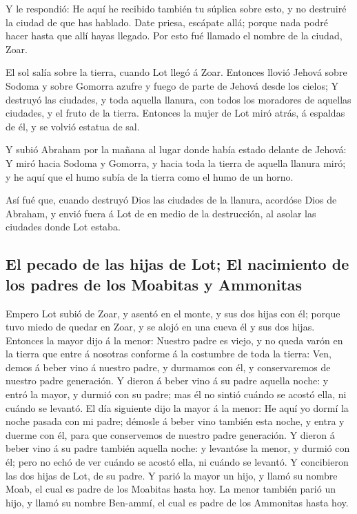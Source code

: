  Y le respondió: He aquí he recibido también tu súplica
sobre esto, y no destruiré la ciudad de que has hablado. 
Date priesa, escápate allá; porque nada podré hacer hasta que allí hayas
llegado. Por esto fué llamado el nombre de la ciudad, Zoar.

 El sol salía sobre la tierra, cuando Lot llegó á Zoar.
 Entonces llovió Jehová sobre Sodoma y sobre Gomorra azufre
y fuego de parte de Jehová desde los cielos;  Y destruyó
las ciudades, y toda aquella llanura, con todos los moradores de
aquellas ciudades, y el fruto de la tierra.  Entonces la
mujer de Lot miró atrás, á espaldas de él, y se volvió estatua de sal.

 Y subió Abraham por la mañana al lugar donde había estado
delante de Jehová:  Y miró hacia Sodoma y Gomorra, y hacia
toda la tierra de aquella llanura miró; y he aquí que el humo subía de
la tierra como el humo de un horno.

 Así fué que, cuando destruyó Dios las ciudades de la
llanura, acordóse Dios de Abraham, y envió fuera á Lot de en medio de la
destrucción, al asolar las ciudades donde Lot estaba.

\hypertarget{el-pecado-de-las-hijas-de-lot-el-nacimiento-de-los-padres-de-los-moabitas-y-ammonitas}{%
\subsection{El pecado de las hijas de Lot; El nacimiento de los padres
de los Moabitas y
Ammonitas}\label{el-pecado-de-las-hijas-de-lot-el-nacimiento-de-los-padres-de-los-moabitas-y-ammonitas}}

 Empero Lot subió de Zoar, y asentó en el monte, y sus dos
hijas con él; porque tuvo miedo de quedar en Zoar, y se alojó en una
cueva él y sus dos hijas.  Entonces la mayor dijo á la
menor: Nuestro padre es viejo, y no queda varón en la tierra que entre á
nosotras conforme á la costumbre de toda la tierra:  Ven,
demos á beber vino á nuestro padre, y durmamos con él, y conservaremos
de nuestro padre generación.  Y dieron á beber vino á su
padre aquella noche: y entró la mayor, y durmió con su padre; mas él no
sintió cuándo se acostó ella, ni cuándo se levantó.  El día
siguiente dijo la mayor á la menor: He aquí yo dormí la noche pasada con
mi padre; démosle á beber vino también esta noche, y entra y duerme con
él, para que conservemos de nuestro padre generación.  Y
dieron á beber vino á su padre también aquella noche: y levantóse la
menor, y durmió con él; pero no echó de ver cuándo se acostó ella, ni
cuándo se levantó.  Y concibieron las dos hijas de Lot, de
su padre.  Y parió la mayor un hijo, y llamó su nombre
Moab, el cual es padre de los Moabitas hasta hoy.  La menor
también parió un hijo, y llamó su nombre Ben-ammí, el cual es padre de
los Ammonitas hasta hoy.

